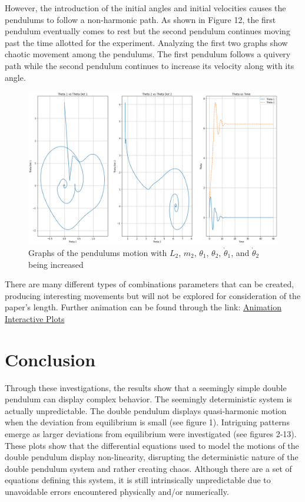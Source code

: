 \documentclass[linenumbers,RNAAS,trackchanges]{aastex631}
\begin{document}
However, the introduction of the initial angles and initial velocities causes the pendulums to follow a non-harmonic path. As shown in Figure 12, the first pendulum eventually comes to rest but the second pendulum continues moving past the time allotted for the experiment. Analyzing the first two graphs show chaotic movement among the pendulums. The first pendulum follows a quivery path while the second pendulum continues to increase its velocity along with its angle. 
\begin{figure}[H]
    \centering
    \centering
    \includegraphics[scale=.30]{wonky.png}
    \caption{Graphs of the pendulums motion with $L_2$, $m_2$, $\theta_1$, $\theta_2$, $\dot\theta_1$, and $\dot\theta_2$ being increased}
    \label{fig:code}
\end{figure}
There are many different types of combinations parameters that can be created, producing interesting movements but will not be explored for consideration of the paper's length. Further animation can be found through the link: \href{https://drive.google.com/file/d/10Jvuc9amuOyc7-DA5pSDOUm4YVg-A3B9/view?usp=share_link}{Animation}
\href{https://colab.research.google.com/drive/13S_AaAXCl-azm20LnW0CQ7vJEFCP3yjH?usp=sharing}{Interactive Plots}
\section{Conclusion} \label{sec:conclusion}
Through these investigations, the results show that a seemingly simple double pendulum can display complex behavior. The seemingly deterministic system is actually unpredictable. The double pendulum displays quasi-harmonic motion when the deviation from equilibrium is small (see figure 1). Intriguing patterns emerge as larger deviations from equilibrium were investigated (see figures 2-13). These plots show that the differential equations used to model the motions of the double pendulum display non-linearity, disrupting the deterministic nature of the double pendulum system and rather creating chaos. Although there are a set of equations defining this system, it is still intrinsically unpredictable due to unavoidable errors encountered physically and/or numerically. 
\end{document}
